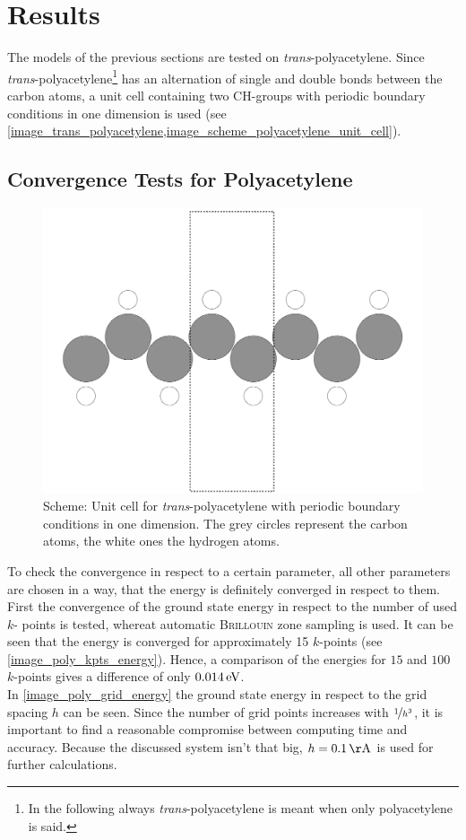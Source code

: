 \chapter{Results}
The models of the previous sections are tested on \emph{trans}-polyacetylene. Since \emph{trans}-polyacetylene\footnote{In the following always \emph{trans}-polyacetylene is meant when only polyacetylene is said.} has an alternation of single and double bonds between the carbon atoms, a unit cell containing two CH-groups with periodic boundary conditions in one dimension is used (see \cref{image_trans_polyacetylene,image_scheme_polyacetylene_unit_cell}). 

\section{Convergence Tests for Polyacetylene}
\begin{figure}[]
	\centering
	\includegraphics[width = .5\textwidth]{Images/polyacetylene/convergence/polyacetylene_nice_unit_cell}
	\caption{Scheme: Unit cell for \emph{trans}-polyacetylene with periodic boundary conditions in one dimension. The grey circles represent the carbon atoms, the white ones the hydrogen atoms.}
	\label{image_scheme_polyacetylene_unit_cell}
\end{figure}
To check the convergence in respect to a certain parameter, all other parameters are chosen in a way, that the energy is definitely converged in respect to them.\\
First the convergence of the ground state energy in respect to the number of used $k$- points is tested, whereat automatic \textsc{Brillouin} zone sampling is used. It can be seen that the energy is converged for approximately 15 $k$-points (see \cref{image_poly_kpts_energy}). Hence, a comparison of the energies for $15$ and $100$ $k$-points gives a difference of only $\unit[0.014]{eV}$.\\
In \cref{image_poly_grid_energy} the ground state energy in respect to the grid spacing $h$ can be seen. Since the number of grid points increases with $\nicefrac{1}{h^3}$, it is important to find a reasonable compromise between computing time and accuracy. Because the discussed system isn't that big, $h = \unit[0.1]{\AA}$ is used for further calculations.\\
